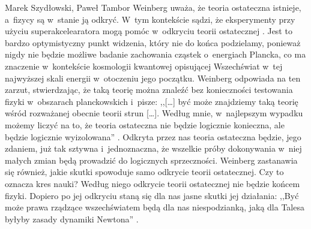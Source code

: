 \begin{artplenv2auth}{Marek Szydłowski, Paweł Tambor}
Weinberg uważa, że teoria ostateczna istnieje, a~fizycy są w~stanie ją odkryć. W~tym kontekście sądzi, że eksperymenty przy użyciu superakcelearatora mogą pomóc w~odkryciu teorii ostatecznej
\parencite[][s.~186]{weinberg_sen_1992}. %
 Jest to bardzo optymistyczny punkt widzenia, który nie do końca podzielamy, ponieważ nigdy nie będzie możliwe badanie zachowania cząstek o~energiach Plancka, co ma znaczenie w~kontekście kosmologii kwantowej opisującej Wszechświat w~tej najwyższej skali energii w~otoczeniu jego początku. \mbox{Weinberg} odpowiada na ten zarzut, stwierdzając, że taką teorię można znaleźć bez konieczności testowania fizyki w~obszarach planckowskich i~pisze: ,,[\ldots] być może znajdziemy taką teorię wśród rozważanej obecnie teorii strun [\ldots]. Według mnie, w~najlepszym wypadku możemy liczyć na to, że teoria ostateczna nie będzie logicznie konieczna, ale będzie logicznie wyizolowana'' 
\parencite[][s.~187]{weinberg_sen_1992}. %
 Odkryta przez nas teoria ostateczna będzie, jego zdaniem, już tak sztywna i~jednoznaczna, że wszelkie próby dokonywania w~niej małych zmian będą prowadzić do logicznych sprzeczności. Weinberg zastanawia się również, jakie skutki spowoduje samo odkrycie teorii ostatecznej. Czy to oznacza kres nauki? Według niego odkrycie teorii ostatecznej nie będzie końcem fizyki. Dopiero po jej odkryciu staną się dla nas jasne skutki jej działania: ,,Być może prawa rządzące wszechświatem będą dla nas niespodzianką, jaką dla Talesa byłyby zasady dynamiki Newtona'' 
\parencite[][s.~190]{weinberg_sen_1992}.%



\end{artplenv2auth}
